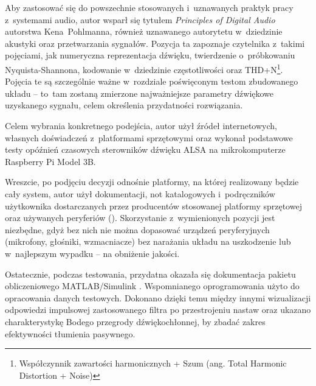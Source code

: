 Aby zastosować się do powszechnie stosowanych i~uznawanych praktyk pracy z~systemami audio, autor wsparł się tytułem \textit{Principles of Digital Audio} \cite{Pohlmann2010} autorstwa Kena~Pohlmanna, również uznawanego autorytetu w~dziedzinie akustyki oraz przetwarzania sygnałów. Pozycja ta zapoznaje czytelnika z~takimi pojęciami, jak numeryczna reprezentacja d\'zwięku, twierdzenie o~próbkowaniu Nyquista-Shannona, kodowanie w~dziedzinie częstotliwości oraz THD+N\footnote{Współczynnik zawartości harmonicznych + Szum	(ang. Total Harmonic Distortion + Noise)}. Pojęcia te są szczególnie ważne w~rozdziale poświęconym testom zbudowanego układu -- to~tam zostaną zmierzone najważniejsze parametry d\'zwiękowe uzyskanego sygnału, celem określenia przydatności rozwiązania.

Celem wybrania konkretnego podejścia, autor użył źródeł internetowych, własnych doświadczeń z~platformami sprzętowymi oraz wykonał podstawowe testy opóźnień czasowych sterowników dźwięku ALSA na mikrokomputerze Raspberry Pi Model 3B.

Wreszcie, po podjęciu decyzji odnośnie platformy, na której realizowany będzie cały system, autor użył dokumentacji, not katalogowych i~podręczników użytkownika dostarczanych przez producentów stosowanej platformy sprzętowej oraz używanych peryferiów (\cite{speakeropamp, RM0390}). Skorzystanie z~wymienionych pozycji jest niezbędne, gdyż bez nich nie można dopasować urządzeń peryferyjnych (mikrofony, głośniki, wzmacniacze) bez narażania układu na uszkodzenie lub w~najlepszym wypadku -- na obniżenie jakości.

Ostatecznie, podczas testowania, przydatna okazała się dokumentacja pakietu obliczeniowego MATLAB/Simulink \cite{Matlab}. Wspomnianego oprogramowania użyto do opracowania danych testowych. Dokonano dzięki temu między innymi wizualizacji odpowiedzi impulsowej zastosowanego filtra po przestrojeniu nastaw oraz ukazano charakterystykę Bodego przegrody dźwiękochłonnej, by zbadać zakres efektywności tłumienia pasywnego.